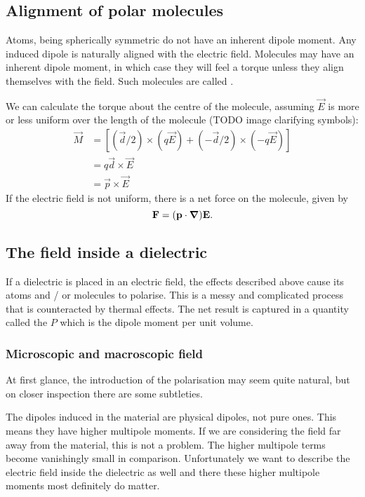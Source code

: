 \subsection{Alignment of polar molecules}
Atoms, being spherically symmetric do not have an inherent dipole moment. Any induced dipole is naturally aligned with the electric field. Molecules may have an inherent dipole moment, in which case they will feel a torque unless they align themselves with the field. Such molecules are called .

We can calculate the torque about the centre of the molecule, assuming $\vec{E}$ is more or less uniform over the length of the molecule (TODO image clarifying symbols):
\begin{align*}
\vec{M} &= [(\vec{d}/2) \times (q \vec{E}) + (- \vec{d}/2) \times (-q \vec{E})] \\
&= q \vec{d}\times \vec{E} \\
&= \vec{p}\times \vec{E}
\end{align*}
If the electric field is not uniform, there is a net force on the molecule, given by
\[ \bm{\mathrm{F}} = (\bm{\mathrm{p}}\cdot \operatorname{\bm{\mathrm{\nabla}}}) \bm{\mathrm{E}}. \]

\subsection{The field inside a dielectric}
If a dielectric is placed in an electric field, the effects described above cause its atoms and / or molecules to polarise. This is a messy and complicated process that is counteracted by thermal effects. The net result is captured in a quantity called the  $P$ which is the dipole moment per unit volume.

\subsubsection{Microscopic and macroscopic field}
At first glance, the introduction of the polarisation may seem quite natural, but on closer inspection there are some subtleties.

The dipoles induced in the material are physical dipoles, not pure ones. This means they have higher multipole moments. If we are considering the field far away from the material, this is not a problem. The higher multipole terms become vanishingly small in comparison. Unfortunately we want to describe the electric field inside the dielectric as well and there these higher multipole moments most definitely do matter.

